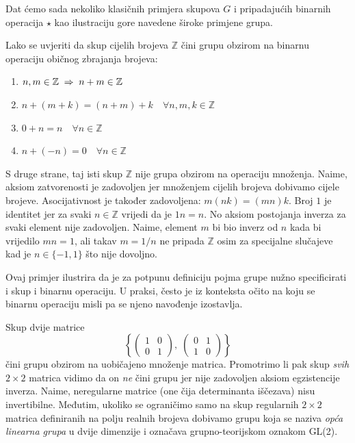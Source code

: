 Dat ćemo sada nekoliko klasičnih primjera skupova $G$ i pripadajućih
binarnih operacija $\star$ kao ilustraciju gore navedene široke primjene grupa.

\begin{primjer}[$\mathbb{Z}$, +]
 Lako se uvjeriti da skup cijelih brojeva $\mathbb{Z}$ 
 čini grupu obzirom
 na binarnu operaciju običnog zbrajanja brojeva:
\begin{enumerate}
\item $n,m \in  \mathbb{Z} \;\Rightarrow\; n+m \in  \mathbb{Z}$
\item $n+(m+k)=(n+m)+k \quad \forall n,m,k \in \mathbb{Z}$
\item $0+n=n \quad \forall n\in\mathbb{Z}$ \quad {}
\item $n+(-n)=0 \quad \forall n\in\mathbb{Z}$  \quad {}
\end{enumerate}
\end{primjer}

\begin{primjer}
S druge strane, taj isti skup $\mathbb{Z}$ nije grupa obzirom na
operaciju množenja. Naime, aksiom zatvorenosti je zadovoljen jer
množenjem cijelih brojeva dobivamo cijele brojeve. Asocijativnost
je također zadovoljena: $m(nk)=(mn)k$. Broj $1$ je identitet jer
za svaki $n\in\mathbb{Z}$ vrijedi da je $1n=n$.
No aksiom postojanja inverza za svaki element nije zadovoljen.
Naime, element $m$ bi bio inverz od $n$ kada bi vrijedilo $mn=1$, ali takav $m=1/n$
ne pripada $\mathbb{Z}$ osim za specijalne slučajeve
kad je $n\in\{-1, 1\}$ što nije dovoljno.
\end{primjer}

Ovaj primjer ilustrira da je za potpunu definiciju pojma grupe nužno
specificirati i skup i binarnu operaciju. U praksi, često je iz konteksta
očito na koju se binarnu operaciju misli pa se njeno navođenje izostavlja.

\begin{primjer}
    \label{th:dvijemat}
Skup dvije matrice
\[\left\{
\begin{pmatrix}
1 & 0 \\ 0 & 1
\end{pmatrix}, \;
\begin{pmatrix}
0 & 1 \\ 1 & 0
\end{pmatrix}
\right\} \]
čini grupu obzirom na uobičajeno množenje matrica. Promotrimo li pak skup
\emph{svih} $2\times2$ matrica vidimo da on \emph{ne} čini grupu jer nije
zadovoljen aksiom egzistencije inverza. Naime, neregularne matrice (one
čija determinanta iščezava) nisu invertibilne. Međutim, ukoliko se
ograničimo samo na skup regularnih  $2\times2$ matrica definiranih na polju
realnih brojeva dobivamo grupu
koja se naziva \emph{opća linearna grupa} u dvije dimenzije i označava
grupno-teorijskom oznakom GL(2).
\end{primjer}

